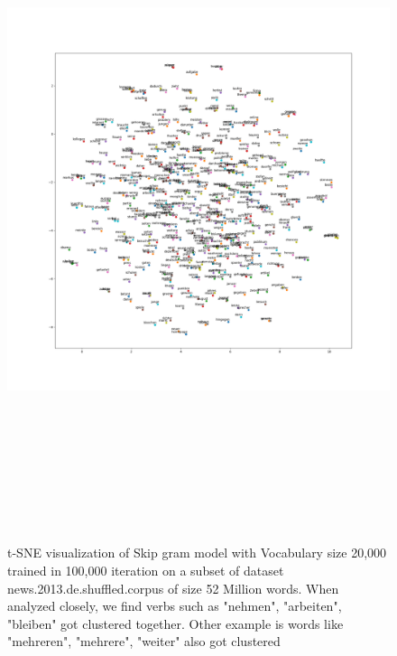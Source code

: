 \begin{figure}[H]
	\hskip-2cm
	\includegraphics[width=20cm,height=20cm,keepaspectratio]{files/deWiki20kVocab/tsne.png}
	\caption{t-SNE visualization of Skip gram model with Vocabulary size 20,000 trained in 100,000 iteration on a subset of dataset news.2013.de.shuffled.corpus of size 52 Million words. When analyzed closely, we find verbs such as "nehmen", "arbeiten", "bleiben" got clustered together. Other example is words like "mehreren", "mehrere", "weiter" also got clustered}
	\label{fig:tsnee4}
\end{figure}
